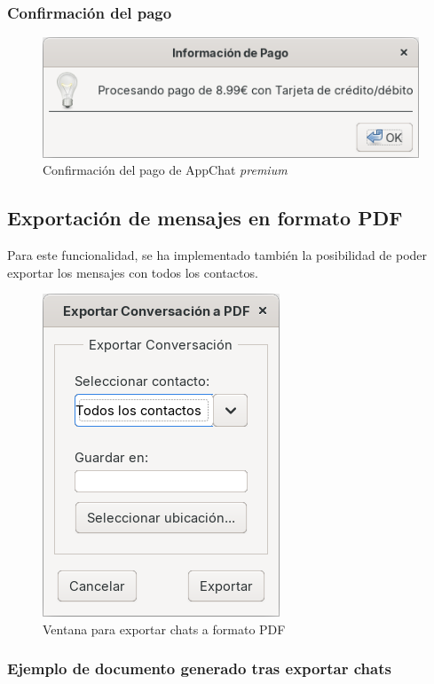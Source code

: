 \documentclass[11pt]{article}
\begin{document}
\subsubsection{Confirmación del pago}

\begin{figure}[H]
	\centering
	\includegraphics[width=0.35\linewidth]{figures/premium-payment}
	\caption{Confirmación del pago de AppChat \textit{premium}}
	\label{fig:premium-payment}
\end{figure}

\subsection{Exportación de mensajes en formato PDF}

Para este funcionalidad, se ha implementado también la posibilidad de poder exportar los mensajes con todos los contactos.

\begin{figure}[H]
	\centering
	\includegraphics[width=0.25\linewidth]{figures/export}
	\caption{Ventana para exportar chats a formato PDF}
	\label{fig:export}
\end{figure}

\subsubsection{Ejemplo de documento generado tras exportar chats}
\end{document}
